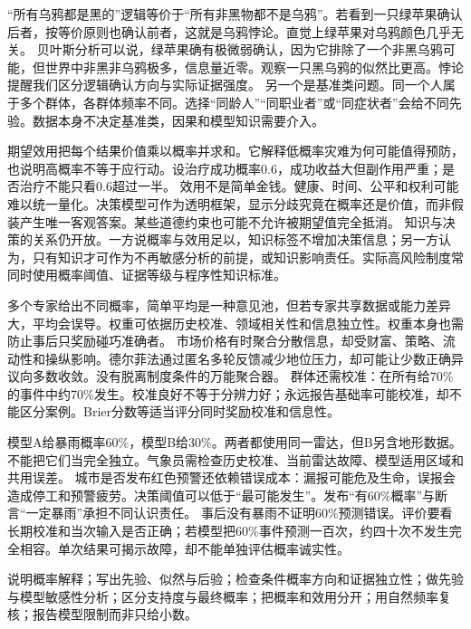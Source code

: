 “所有乌鸦都是黑的”逻辑等价于“所有非黑物都不是乌鸦”。若看到一只绿苹果确认后者，按等价原则也确认前者，这就是乌鸦悖论。直觉上绿苹果对乌鸦颜色几乎无关。 贝叶斯分析可以说，绿苹果确有极微弱确认，因为它排除了一个非黑乌鸦可能，但世界中非黑非乌鸦极多，信息量近零。观察一只黑乌鸦的似然比更高。悖论提醒我们区分逻辑确认方向与实际证据强度。 另一个是基准类问题。同一个人属于多个群体，各群体频率不同。选择“同龄人”“同职业者”或“同症状者”会给不同先验。数据本身不决定基准类，因果和模型知识需要介入。

期望效用把每个结果价值乘以概率并求和。它解释低概率灾难为何可能值得预防，也说明高概率不等于应行动。设治疗成功概率0.6，成功收益大但副作用严重；是否治疗不能只看0.6超过一半。 效用不是简单金钱。健康、时间、公平和权利可能难以统一量化。决策模型可作为透明框架，显示分歧究竟在概率还是价值，而非假装产生唯一客观答案。某些道德约束也可能不允许被期望值完全抵消。 知识与决策的关系仍开放。一方说概率与效用足以，知识标签不增加决策信息；另一方认为，只有知识才可作为不再敏感分析的前提，或知识影响责任。实际高风险制度常同时使用概率阈值、证据等级与程序性知识标准。

多个专家给出不同概率，简单平均是一种意见池，但若专家共享数据或能力差异大，平均会误导。权重可依据历史校准、领域相关性和信息独立性。权重本身也需防止事后只奖励碰巧准确者。 市场价格有时聚合分散信息，却受财富、策略、流动性和操纵影响。德尔菲法通过匿名多轮反馈减少地位压力，却可能让少数正确异议向多数收敛。没有脱离制度条件的万能聚合器。 群体还需校准：在所有给70\%的事件中约70\%发生。校准良好不等于分辨力好；永远报告基础率可能校准，却不能区分案例。Brier分数等适当评分同时奖励校准和信息性。

模型A给暴雨概率60\%，模型B给30\%。两者都使用同一雷达，但B另含地形数据。不能把它们当完全独立。气象员需检查历史校准、当前雷达故障、模型适用区域和共用误差。 城市是否发布红色预警还依赖错误成本：漏报可能危及生命，误报会造成停工和预警疲劳。决策阈值可以低于“最可能发生”。发布“有60\%概率”与断言“一定暴雨”承担不同认识责任。 事后没有暴雨不证明60\%预测错误。评价要看长期校准和当次输入是否正确；若模型把60\%事件预测一百次，约四十次不发生完全相容。单次结果可揭示故障，却不能单独评估概率诚实性。

\begin{tcolorbox}[breakable,colback=white,colframe=blue!30!black,title={形式分析清单},fonttitle=\bfseries]
说明概率解释；写出先验、似然与后验；检查条件概率方向和证据独立性；做先验与模型敏感性分析；区分支持度与最终概率；把概率和效用分开；用自然频率复核；报告模型限制而非只给小数。
\end{tcolorbox}

